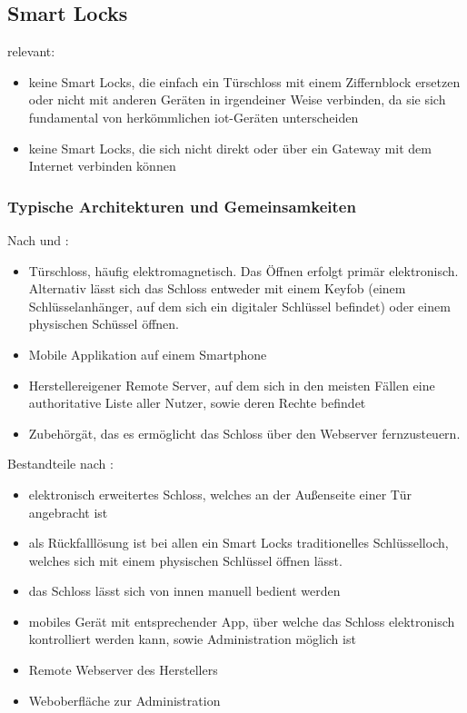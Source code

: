 \subsection{Smart Locks}
\label{sec:sota_smart_locks}

	relevant: \cite{Ye2017}\cite{Fuller2017}\cite{Rose2016}\cite{Ho2016}
	
	\begin{itemize}
	    \item keine Smart Locks, die einfach ein Türschloss mit einem Ziffernblock ersetzen oder nicht mit anderen Geräten in irgendeiner Weise verbinden, da sie sich fundamental von herkömmlichen \gls{iot}-Geräten unterscheiden\cite{Ho2016}
	    \item keine Smart Locks, die sich nicht direkt oder über ein Gateway mit dem Internet verbinden können\cite{Ho2016}
	\end{itemize}
	
	\subsubsection{Typische Architekturen und Gemeinsamkeiten}
	    Nach \citeauthor{Ye2017} und \citeauthor{Fuller2017}:
		\begin{itemize}
			\item Türschloss, häufig elektromagnetisch. Das Öffnen erfolgt primär elektronisch. Alternativ lässt sich das Schloss entweder mit einem Keyfob (einem Schlüsselanhänger, auf dem sich ein digitaler Schlüssel befindet) oder einem physischen Schüssel öffnen.
			\item Mobile Applikation auf einem Smartphone
			\item Herstellereigener Remote Server, auf dem sich in den meisten Fällen eine authoritative Liste aller Nutzer, sowie deren Rechte befindet
			\item Zubehörgät, das es ermöglicht das Schloss über den Webserver fernzusteuern.
		\end{itemize}

		Bestandteile nach \citeauthor{Ho2016}:
		\begin{itemize}
		    \item elektronisch erweitertes Schloss, welches an der Außenseite einer Tür angebracht ist
		    \item als Rückfalllösung ist bei allen ein Smart Locks traditionelles Schlüsselloch, welches sich mit einem physischen Schlüssel öffnen lässt.
		    \item das Schloss lässt sich von innen manuell bedient werden
		    \item mobiles Gerät mit entsprechender App, über welche das Schloss elektronisch kontrolliert werden kann, sowie Administration möglich ist
		    \item Remote Webserver des Herstellers
		    \item Weboberfläche zur Administration
		\end{itemize}


